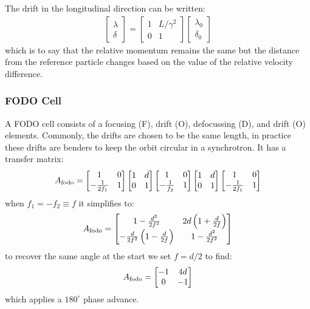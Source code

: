 \documentclass{article}
\numberwithin{equation}{section}
\begin{document}
The drift in the longitudinal direction can be written:
\begin{align}
\begin{bmatrix} \lambda \\ \delta \end{bmatrix} =
\begin{bmatrix} 1 & L/\gamma^2 \\ 0 & 1 \end{bmatrix}\begin{bmatrix} \lambda_0 \\ \delta_0 \end{bmatrix}
\end{align}
which is to say that the relative momentum remains the same but the distance from the reference particle changes based on the value of the relative velocity difference.

\subsubsection{FODO Cell}
A FODO cell consists of a focusing (F), drift (O), defocussing (D), and drift (O) elements. Commonly, the drifts are chosen to be the same length, in practice these drifts are benders to keep the orbit circular in a synchrotron. It has a transfer matrix:
\begin{align}
A_{\rm fodo} = 
\begin{bmatrix} 1 & 0 \\ -\frac{1}{2f_1} & 1 \end{bmatrix}
\begin{bmatrix} 1 & d \\ 0 & 1 \end{bmatrix}
\begin{bmatrix} 1 & 0 \\ -\frac{1}{f_2} & 1 \end{bmatrix}
\begin{bmatrix} 1 & d \\ 0 & 1 \end{bmatrix}
\begin{bmatrix} 1 & 0 \\ -\frac{1}{2f_1} & 1 \end{bmatrix}
\end{align}
when $f_1=-f_2 \equiv f$ it simplifies to:
\begin{align}
A_{\rm fodo} = 
\begin{bmatrix} 1-\frac{d^2}{2f^2} & 2d \left( 1 + \frac{d}{2f} \right) \\ 
- \frac{d}{2f^2}\left( 1 - \frac{d}{2f} \right) & 1-\frac{d^2}{2f^2} \end{bmatrix}
\end{align}
to recover the same angle at the start we set $f = d/2$ to find:
\begin{align}
A_{\rm fodo} = 
\begin{bmatrix} -1 & 4d  \\ 0 & -1 \end{bmatrix}
\end{align}
which applies a $180^\circ$ phase advance.
\end{document}
